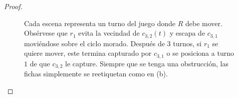 \begin{proof}
\begin{figure}[!htbp]
\begin{tcbitemize}
{\begin{tikzpicture}
                        \end{tikzpicture}
                    }
            
            \tcbitem
                \tcblower
            \tcbitem
                \tcblower
            
                \tcbitem
                    \tcblower
        \end{tcbitemize}
        \captionsetup{font=footnotesize}
        \caption{Cada escena representa un turno del juego donde $R$ debe mover.
        Obs\'ervese que $r_1$ evita la vecindad de $c_{3,2}(t)$ y escapa de
        $c_{3,1}$ movi\'endose sobre el ciclo morado. Despu\'es de $3$ turnos,
        si $r_1$ se quiere mover, este termina capturado por $c_{3,1}$ o se
        posiciona a turno $1$ de que $c_{3,2}$ le capture. Siempre que se tenga
        una obstrucci\'on, las fichas simplemente se reetiquetan como en (b).}
        \label{fig:cycle}
    \end{figure}


\end{proof}
